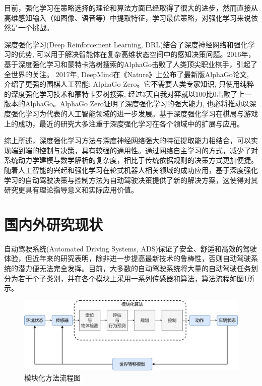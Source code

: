 目前，强化学习在策略选择的理论和算法方面已经取得了很大的进步，然而直接从高维感知输入（如图像、语音等）中提取特征，学习最优策略，对强化学习来说依然是一个挑战。

深度强化学习(Deep Reinforcement Learning, DRL)结合了深度神经网络和强化学习的优势, 可以用于解决智能体在复杂高维状态空间中的感知决策问题\cite{唐振韬2017深度强化学习进展}\cite{2017Deep}。2016年，基于深度强化学习和蒙特卡洛树搜索的AlphaGo击败了人类顶尖职业棋手，引起了全世界的关注\cite{2017Review}。 2017年, DeepMind在《Nature》上公布了最新版AlphaGo论文, 介绍了更强的围棋人工智能: AlphaGo Zero。它不需要人类专家知识, 只使用纯粹的深度强化学习技术和蒙特卡罗树搜索, 经过3天自我对弈就以100比0击败了上一版本的AlphaGo。AlphaGo Zero证明了深度强化学习的强大能力, 也必将推动以深度强化学习为代表的人工智能领域的进一步发展。基于深度强化学习在棋局与游戏上的成功，最近的研究大多注重于深度强化学习在各个领域中的扩展与应用。

综上所述，深度强化学习方法与深度神经网络强大的特征提取能力相结合，可以实现端到端的控制与决策，具有较强的通用性。通过网络自主学习的方式，减少了对系统动力学建模与数学解析的复杂度，相比于传统依据规则的决策方式更加便捷。随着人工智能的兴起和强化学习在轮式机器人相关领域的成功应用，基于深度强化学习的自动驾驶决策与控制方法为自动驾驶决策提供了新的解决方案，这使得对其研究更具有理论指导意义和实际应用价值。

\section{国内外研究现状} %

自动驾驶系统(Automated Driving Systems, ADS)保证了安全、舒适和高效的驾驶体验，但近年来的研究表明，除非进一步提高最新技术的鲁棒性，否则自动驾驶系统的潜力便无法完全发挥\cite{2019AutoDrive}。目前，大多数的自动驾驶系统将大量的自动驾驶任务划分为若干个子类别，并在各个模块上采用一系列传感器和算法，算法流程如图\ref{模块化方法流程图}所示。

\begin{figure}[htbp]
  \vspace{13pt} %
  \centering
  \includegraphics[width=1.0\textwidth]{images/chapter1/Autodrive_structure.png}
  \caption{模块化方法流程图}\label{模块化方法流程图} %
\end{figure}


